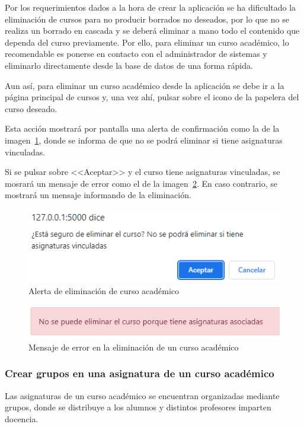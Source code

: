 Por los requerimientos dados a la hora de crear la aplicación se ha dificultado la eliminación de cursos para no producir borrados no deseados, por lo que no se realiza un borrado en cascada y se deberá eliminar a mano todo el contenido que dependa del curso previamente.
Por ello, para eliminar un curso académico, lo recomendable es ponerse en contacto con el administrador de sistemas y eliminarlo directamente desde la base de datos de una forma rápida.

Aun así, para eliminar un curso académico desde la aplicación se debe ir a la página principal de cursos y, una vez ahí, pulsar sobre el icono de la papelera del curso deseado.

Esta acción mostrará por pantalla una alerta de confirmación como la de la imagen~\ref{pag:alertElCurso}, donde se informa de que no se podrá eliminar si tiene asignaturas vinculadas.

Si se pulsar sobre <<Aceptar>> y el curso tiene asignaturas vinculadas, se mosrará un mensaje de error como el de la imagen~\ref{pag:menErrorElCurso}. 
En caso contrario, se mostrará un mensaje informando de la eliminación.

\begin{figure}
	\centering
	\includegraphics[width=.7\textwidth]{../img/Anexos/Manual usuario/alertElCurso.png}
	\caption{Alerta de eliminación de curso académico}\label{pag:alertElCurso}
\end{figure}

\begin{figure}
	\centering
	\includegraphics[width=.7\textwidth]{../img/Anexos/Manual usuario/menErrorElCurso.png}
	\caption{Mensaje de error en la eliminación de un curso académico}\label{pag:menErrorElCurso}
\end{figure}

\subsubsection{Crear grupos en una asignatura de un curso académico}
Las asignaturas de un curso académico se encuentran organizadas mediante grupos, donde se distribuye a los alumnos y distintos profesores imparten docencia.

